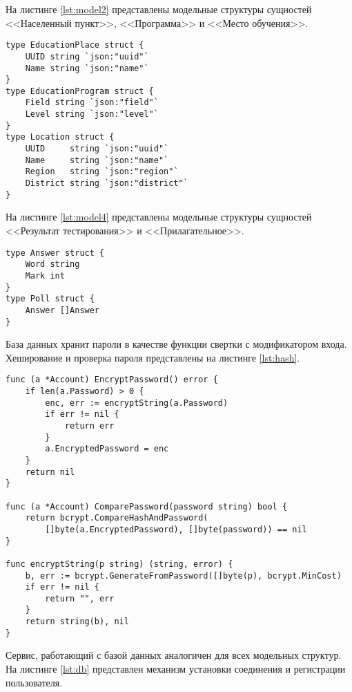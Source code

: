 На листинге \ref{lst:model2} представлены модельные структуры сущностей <<Населенный пункт>>, <<Программа>> и <<Место обучения>>.
\begin{lstlisting}[label=lst:model2,caption=Модельные структуры сущностей <<Населенный пункт>>\, <<Программа>> и <<Место обучения>>]
type EducationPlace struct {
	UUID string `json:"uuid"`
	Name string `json:"name"`
}
type EducationProgram struct {
	Field string `json:"field"`
	Level string `json:"level"`
}
type Location struct {
	UUID     string `json:"uuid"`
	Name     string `json:"name"`
	Region   string `json:"region"`
	District string `json:"district"`
}
\end{lstlisting}
На листинге \ref{lst:model4} представлены модельные структуры сущностей <<Результат тестирования>> и <<Прилагательное>>.
\begin{lstlisting}[label=lst:model4,caption=Модельные структуры сущностей <<Результат тестирования>> и <<Прилагательное>>]
type Answer struct {
	Word string
	Mark int
}
type Poll struct {
	Answer []Answer
}
\end{lstlisting}

База данных хранит пароли в качестве функции свертки с модификатором входа. Хеширование и проверка пароля представлены на листинге \ref{lst:hash}.
\begin{lstlisting}[label=lst:hash,caption=Хеширование и проверка пароля]
func (a *Account) EncryptPassword() error {
	if len(a.Password) > 0 {
		enc, err := encryptString(a.Password)
		if err != nil {
			return err
		}
		a.EncryptedPassword = enc
	}
	return nil
}

func (a *Account) ComparePassword(password string) bool {
	return bcrypt.CompareHashAndPassword(
		[]byte(a.EncryptedPassword), []byte(password)) == nil
}

func encryptString(p string) (string, error) {
	b, err := bcrypt.GenerateFromPassword([]byte(p), bcrypt.MinCost)
	if err != nil {
		return "", err
	}
	return string(b), nil
}
\end{lstlisting}

Сервис, работающий с базой данных аналогичен для всех модельных структур. На листинге \ref{lst:db} представлен механизм установки соединения и регистрации пользователя.

